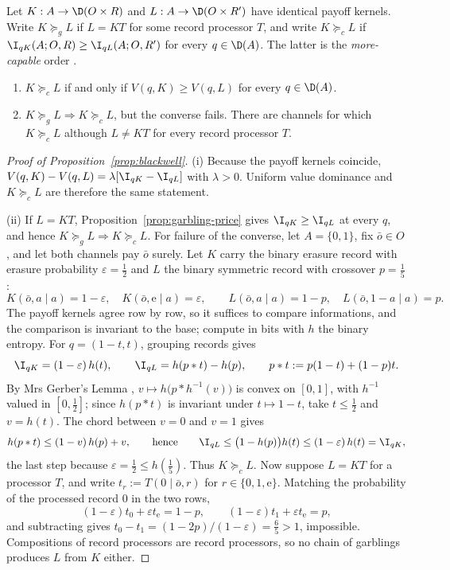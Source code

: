 \begin{proposition}
\label{prop:blackwell}\label{def:channel-orders}
Let $K:A\to\D(O\times R)$ and $L:A\to\D(O\times R')$ have identical
payoff kernels.  Write $K\succeq_gL$ if $L=KT$ for some record processor
$T$, and write $K\succeq_cL$ if
$\I_{qK}(A;O,R)\ge\I_{qL}(A;O,R')$ for every $q\in\D(A)$.  The latter is
the \emph{more-capable} order \cite{KornerMarton1977}.
\begin{enumerate}[label=\textup{(\roman*)},leftmargin=*]
\item $K\succeq_cL$ if and only if $V(q,K)\ge V(q,L)$ for every $q\in\D(A)$.
\item $K\succeq_gL\Rightarrow K\succeq_cL$, but the converse fails.  There are channels for which
$K\succeq_cL$ although $L\ne KT$ for every record processor $T$.
\end{enumerate}
\end{proposition}

\begin{proof}[Proof of Proposition~\ref{prop:blackwell}]
(i) Because the payoff kernels coincide,
$V(q,K)-V(q,L)=\lambda[\I_{qK}-\I_{qL}]$ with $\lambda>0$.  Uniform value dominance and
$K\succeq_cL$ are therefore the same statement.

(ii) If $L=KT$, Proposition~\ref{prop:garbling-price} gives $\I_{qK}\ge\I_{qL}$ at every $q$, and hence
$K\succeq_gL\Rightarrow K\succeq_cL$.  For failure of the converse, let $A=\{0,1\}$, fix $\bar o\in O$, and let
both channels pay $\bar o$ surely.  Let $K$ carry the binary
erasure record with erasure probability $\varepsilon=\tfrac12$ and $L$ the binary symmetric record with crossover
$p=\tfrac15$:
\[
 K(\bar o,a\mid a)=1-\varepsilon,\quad K(\bar o,\mathrm e\mid a)=\varepsilon,
 \qquad
 L(\bar o,a\mid a)=1-p,\quad L(\bar o,1-a\mid a)=p.
\]
The payoff kernels agree row by row, so it suffices to compare informations, and the comparison is invariant to the
base; compute in bits with $h$ the binary entropy.  For $q=(1-t,t)$, grouping records gives
\[
 \I_{qK}=(1-\varepsilon)\,h(t),
 \qquad
 \I_{qL}=h(p\ast t)-h(p),
 \qquad p\ast t:=p(1-t)+(1-p)t.
\]
By Mrs Gerber's Lemma \cite{WynerZiv1973}, $v\mapsto h\bigl(p\ast h^{-1}(v)\bigr)$ is convex on $[0,1]$, with
$h^{-1}$ valued in $[0,\tfrac12]$; since $h(p\ast t)$ is invariant under $t\mapsto1-t$, take $t\le\tfrac12$ and
$v=h(t)$.  The chord between $v=0$ and $v=1$ gives
\[
 h(p\ast t)\le(1-v)\,h(p)+v,
 \qquad\text{hence}\qquad
 \I_{qL}\le\bigl(1-h(p)\bigr)h(t)\le(1-\varepsilon)\,h(t)=\I_{qK},
\]
the last step because $\varepsilon=\tfrac12\le h(\tfrac15)$.  Thus $K\succeq_cL$.  Now suppose $L=KT$ for a
processor $T$, and write $t_r:=T(0\mid \bar o,r)$ for $r\in\{0,1,\mathrm e\}$.  Matching the probability of the
processed record $0$ in the two rows,
\[
 (1-\varepsilon)t_0+\varepsilon t_{\mathrm e}=1-p,
 \qquad
 (1-\varepsilon)t_1+\varepsilon t_{\mathrm e}=p,
\]
and subtracting gives $t_0-t_1=(1-2p)/(1-\varepsilon)=\tfrac65>1$, impossible.  Compositions of record processors
are record processors, so no chain of garblings produces $L$ from $K$ either.
\end{proof}

